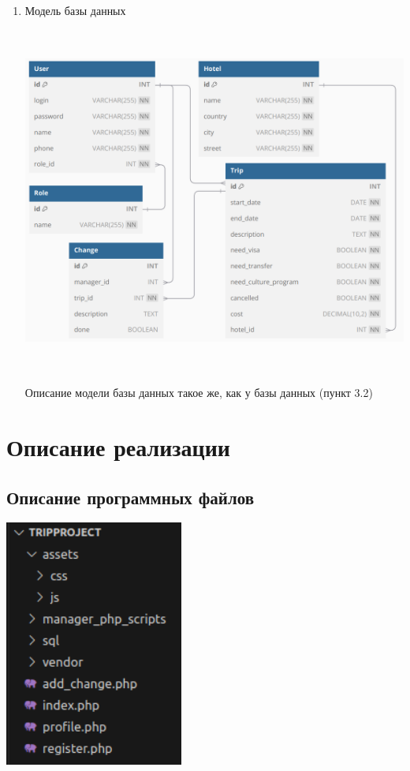 \documentclass[a4paper,12pt]{article}
\begin{document}
\begin{enumerate}
    \item Модель базы данных

          \includegraphics[width=6.010415573053368in, height=4.5in]{media/models/base_model.png}

          Описание модели базы данных такое же, как у базы данных (пункт 3.2)
\end{enumerate}

\section{Описание реализации}

\subsection{Описание программных файлов}

\includegraphics[width=2.317518591426072in, height=3.1979166666666665in]{media/files_description.png}
\end{document}
